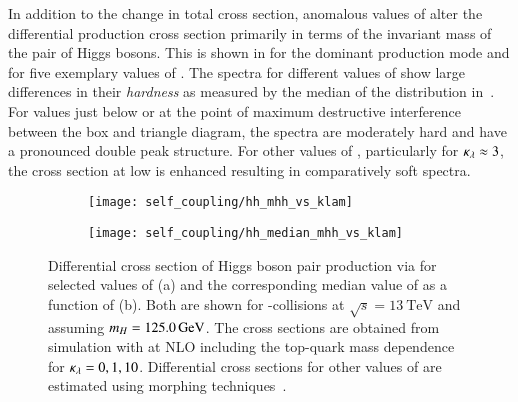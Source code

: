 In addition to the change in total cross section, anomalous values of
\klambda alter the differential \HH production cross section primarily
in terms of the invariant mass of the pair of Higgs bosons. This is
shown in  for the dominant \ggF production mode
and for five exemplary values of \klambda. The \mHH spectra for
different values of \klambda show large differences in their
\emph{hardness} as measured by the median of the \mHH distribution
in~. For \klambda values just below or at the
point of maximum destructive interference between the box and triangle
diagram, the \mHH spectra are moderately hard and have a pronounced
double peak structure. For other values of \klambda, particularly for
$\kappa_{\lambda} \approx 3$, the cross section at low \mHH is enhanced
resulting in comparatively soft \mHH spectra.

\begin{figure}[htbp]
  \begin{subfigure}[t]{0.485\textwidth}
    \texttt{[image: self\_coupling/hh\_mhh\_vs\_klam]}
    \label{fig:hh_xsec_mhh}
  \end{subfigure}\hfill%
  \begin{subfigure}[t]{0.485\textwidth}
    \texttt{[image: self\_coupling/hh\_median\_mhh\_vs\_klam]}
    \label{fig:hh_median_mhh}
  \end{subfigure}

  \caption{Differential cross section of Higgs boson pair production
    via \ggF for selected values of \klambda (a) and the corresponding
    median value of \mHH as a function of \klambda (b). Both are shown
    for \pp-collisions at $\sqrt{s} = \SI{13}{\TeV}$ and assuming
    $m_{H}= \SI{125.0}{\ensuremath{\text{GeV}}}$. The cross sections are obtained from
    simulation with \POWHEGBOX[v2] at NLO including the top-quark mass
    dependence~\cite{Heinrich:2019bkc,Heinrich:2020ckp} for
    $\kappa_{\lambda} = 0, 1, 10$. Differential cross sections for other
    values of \klambda are estimated using morphing
    techniques~\cite{ATL-PHYS-PUB-2019-007}.}
\end{figure}

